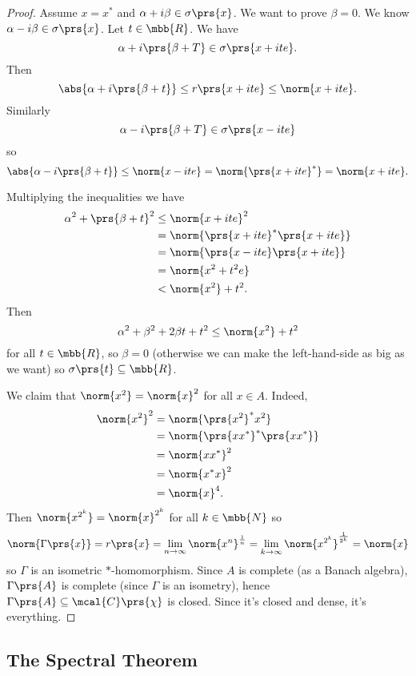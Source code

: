 \documentclass[10pt, twoside]{book}
\begin{document}
\begin{proof}
Assume $x = x^*$ and $\alpha + i \beta \in \sigma\prs{x}$. We want to prove $\beta = 0$. We know $\alpha - i \beta \in \sigma\prs{x}$.
Let $t \in \mbb{R}$. We have \[\alpha + i \prs{\beta + T} \in \sigma\prs{x + i t e} \text{.}\] Then
\[\abs{\alpha + i \prs{\beta + t}} \leq r\prs{x+ite} \leq \norm{x + ite} \text{.}\]
Similarly
\[\alpha - i\prs{\beta + T} \in \sigma\prs{x - ite}\]
so
\[\abs{\alpha - i\prs{\beta+t}} \leq \norm{x-ite} = \norm{\prs{x+ite}^*} = \norm{x+ite} \text{.}\]

Multiplying the inequalities we have
\begin{align*}
\alpha^2 + \prs{\beta + t}^2 &\leq \norm{x + ite}^2
\\&= \norm{\prs{x+ite}^* \prs{x+ite}}
\\&= \norm{\prs{x-ite}\prs{x+ite}}
\\&= \norm{x^2 + t^2 e}
\\&< \norm{x^2} + t^2 \text{.}
\end{align*}
Then
\[\alpha^2 + \beta^2 + 2\beta t + t^2 \leq \norm{x^2} + t^2\]
for all $t \in \mbb{R}$, so $\beta = 0$ (otherwise we can make the left-hand-side as big as we want) so $\sigma\prs{t} \subseteq \mbb{R}$.

We claim that $\norm{x^2} = \norm{x}^2$ for all $x \in A$. Indeed,
\begin{align*}
\norm{x^2}^2 &= \norm{\prs{x^2}^* x^2}
\\&= \norm{\prs{x x^*}^* \prs{x x^*}}
\\&= \norm{x x^*}^2
\\&= \norm{x^* x}^2
\\&= \norm{x}^4 \text{.}
\end{align*}
Then $\norm{x^{2^k}} = \norm{x}^{2^k}$ for all $k \in \mbb{N}$ so
\[\norm{\Gamma\prs{x}} = r\prs{x} = \lim_{n\to\infty} \norm{x^n}^{\frac{1}{n}} = \lim_{k\to\infty} \norm{x^{2^k}}^{\frac{1}{2^k}} = \norm{x}\]
so $\Gamma$ is an isometric $*$-homomorphism.
Since $A$ is complete (as a Banach algebra), $\Gamma\prs{A}$ is complete (since $\Gamma$ is an isometry), hence $\Gamma\prs{A} \subseteq \mcal{C}\prs{\chi}$ is closed. Since it's closed and dense, it's everything.
\end{proof}


\subsection{The Spectral Theorem}
\end{document}
